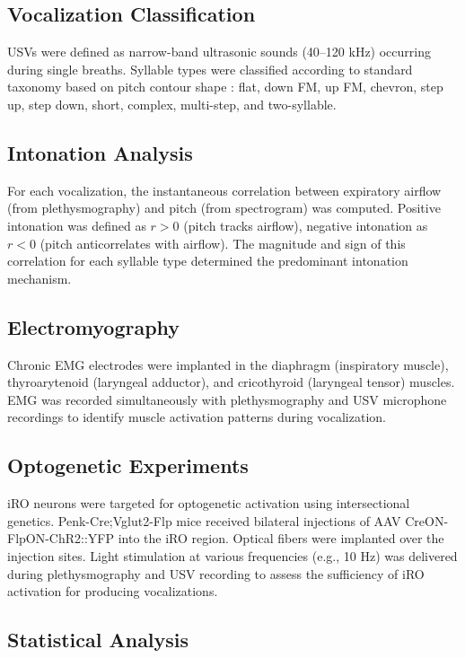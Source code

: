 \documentclass[11pt]{article}
\begin{document}
\subsection{Vocalization Classification}

USVs were defined as narrow-band ultrasonic sounds (40--120 kHz) occurring during single breaths. Syllable types were classified according to standard taxonomy based on pitch contour shape \citep{grimsley2011}: flat, down FM, up FM, chevron, step up, step down, short, complex, multi-step, and two-syllable.

\subsection{Intonation Analysis}

For each vocalization, the instantaneous correlation between expiratory airflow (from plethysmography) and pitch (from spectrogram) was computed. Positive intonation was defined as $r > 0$ (pitch tracks airflow), negative intonation as $r < 0$ (pitch anticorrelates with airflow). The magnitude and sign of this correlation for each syllable type determined the predominant intonation mechanism.

\subsection{Electromyography}

Chronic EMG electrodes were implanted in the diaphragm (inspiratory muscle), thyroarytenoid (laryngeal adductor), and cricothyroid (laryngeal tensor) muscles. EMG was recorded simultaneously with plethysmography and USV microphone recordings to identify muscle activation patterns during vocalization.

\subsection{Optogenetic Experiments}

iRO neurons were targeted for optogenetic activation using intersectional genetics. Penk-Cre;Vglut2-Flp mice received bilateral injections of AAV CreON-FlpON-ChR2::YFP into the iRO region. Optical fibers were implanted over the injection sites. Light stimulation at various frequencies (e.g., 10 Hz) was delivered during plethysmography and USV recording to assess the sufficiency of iRO activation for producing vocalizations.

\subsection{Statistical Analysis}
\end{document}
